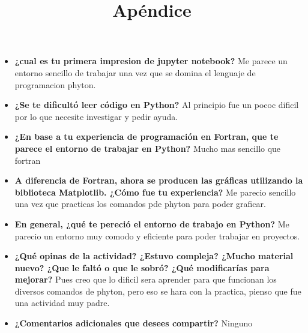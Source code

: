 \documentclass{article}
\begin{document}
\newpage

\title{Apéndice}

\begin{itemize}
\item \textbf{¿cual es tu primera impresion de jupyter notebook?}
Me parece un entorno sencillo de trabajar una vez que se domina el lenguaje de programacion phyton.

\item \textbf{¿Se te dificultó leer código en Python?}
Al principio fue un pococ dificil por lo que necesite investigar y pedir ayuda.

\item \textbf{¿En base a tu experiencia de programación en Fortran, que te parece el entorno de trabajar en Python?}
Mucho mas sencillo que fortran

\item \textbf{A diferencia de Fortran, ahora se producen las gráficas utilizando la biblioteca Matplotlib. ¿Cómo fue tu experiencia?}
Me parecio sencillo una vez que practicas los comandos pde phyton para poder graficar.

\item \textbf{En general, ¿qué te pereció el entorno de trabajo en Python? }
Me parecio un entorno muy comodo y eficiente para poder trabajar en proyectos.

\item \textbf{¿Qué opinas de la actividad? ¿Estuvo compleja? ¿Mucho material nuevo? ¿Que le faltó o que le sobró? ¿Qué modificarías para mejorar? }
Pues creo que lo dificil sera aprender para que funcionan los diversos comandos de phyton, pero eso se hara con la practica, pienso que fue una actividad muy padre.

\item \textbf{¿Comentarios adicionales que desees compartir? }
Ninguno
\end{itemize}
\end{document}
